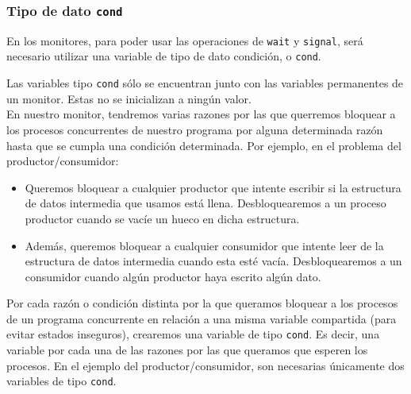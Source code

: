\subsubsection{Tipo de dato \texttt{cond}}
En los monitores, para poder usar las operaciones de \verb|wait| y \verb|signal|, será necesario utilizar una variable de tipo de dato condición, o \verb|cond|. 

Las variables tipo \verb|cond| sólo se encuentran junto con las variables permanentes de un monitor. Estas no se inicializan a ningún valor.\\

En nuestro monitor, tendremos varias razones por las que querremos bloquear a los procesos concurrentes de nuestro programa por alguna determinada razón hasta que se cumpla una condición determinada. Por ejemplo, en el problema del productor/consumidor:
\begin{itemize}
    \item Queremos bloquear a cualquier productor que intente escribir si la estructura de datos intermedia que usamos está llena. Desbloquearemos a un proceso productor cuando se vacíe un hueco en dicha estructura.
    \item Además, queremos bloquear a cualquier consumidor que intente leer de la estructura de datos intermedia cuando esta esté vacía. Desbloquearemos a un consumidor cuando algún productor haya escrito algún dato.
\end{itemize}
Por cada razón o condición distinta por la que queramos bloquear a los procesos de un programa concurrente en relación a una misma variable compartida (para evitar estados inseguros), crearemos una variable de tipo \verb|cond|. Es decir, una variable por cada una de las razones por las que queramos que esperen los procesos. En el ejemplo del productor/consumidor, son necesarias únicamente dos variables de tipo \verb|cond|.\\

